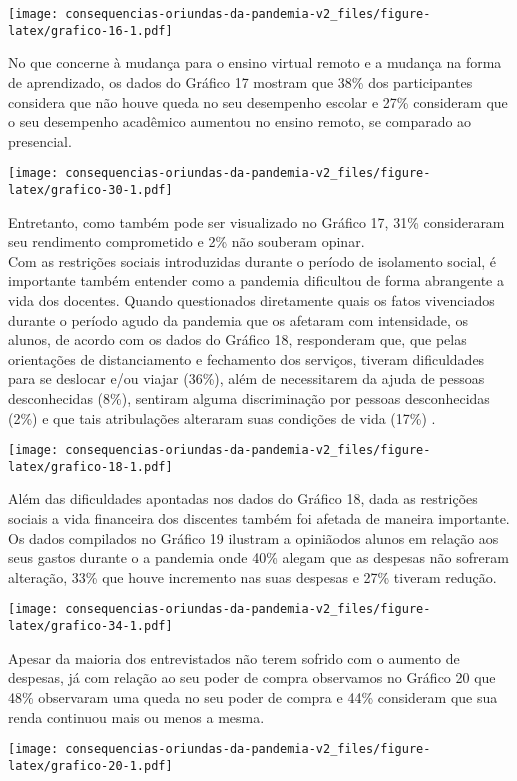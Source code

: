 \documentclass[
]{article}
\begin{document}
\texttt{[image: consequencias-oriundas-da-pandemia-v2\_files/figure-latex/grafico-16-1.pdf]}

No que concerne à mudança para o ensino virtual remoto e a mudança na
forma de aprendizado, os dados do Gráfico 17 mostram que 38\% dos
participantes considera que não houve queda no seu desempenho escolar e
27\% consideram que o seu desempenho acadêmico aumentou no ensino
remoto, se comparado ao presencial.

\texttt{[image: consequencias-oriundas-da-pandemia-v2\_files/figure-latex/grafico-30-1.pdf]}

Entretanto, como também pode ser visualizado no Gráfico 17, 31\%
consideraram seu rendimento comprometido e 2\% não souberam opinar.\\
Com as restrições sociais introduzidas durante o período de isolamento
social, é importante também entender como a pandemia dificultou de forma
abrangente a vida dos docentes. Quando questionados diretamente quais os
fatos vivenciados durante o período agudo da pandemia que os afetaram
com intensidade, os alunos, de acordo com os dados do Gráfico 18,
responderam que, que pelas orientações de distanciamento e fechamento
dos serviços, tiveram dificuldades para se deslocar e/ou viajar (36\%),
além de necessitarem da ajuda de pessoas desconhecidas (8\%), sentiram
alguma discriminação por pessoas desconhecidas (2\%) e que tais
atribulações alteraram suas condições de vida (17\%) .

\texttt{[image: consequencias-oriundas-da-pandemia-v2\_files/figure-latex/grafico-18-1.pdf]}

Além das dificuldades apontadas nos dados do Gráfico 18, dada as
restrições sociais a vida financeira dos discentes também foi afetada de
maneira importante. Os dados compilados no Gráfico 19 ilustram a
opiniãodos alunos em relação aos seus gastos durante o a pandemia onde
40\% alegam que as despesas não sofreram alteração, 33\% que houve
incremento nas suas despesas e 27\% tiveram redução.

\texttt{[image: consequencias-oriundas-da-pandemia-v2\_files/figure-latex/grafico-34-1.pdf]}

Apesar da maioria dos entrevistados não terem sofrido com o aumento de
despesas, já com relação ao seu poder de compra observamos no Gráfico 20
que 48\% observaram uma queda no seu poder de compra e 44\% consideram
que sua renda continuou mais ou menos a mesma.

\texttt{[image: consequencias-oriundas-da-pandemia-v2\_files/figure-latex/grafico-20-1.pdf]}
\end{document}
